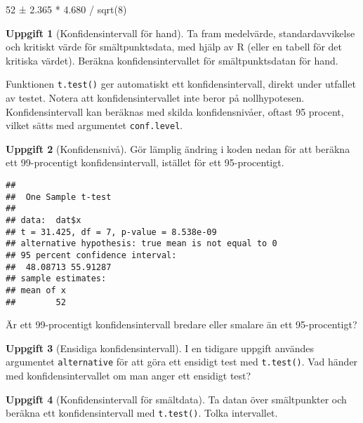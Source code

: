 \documentclass[
]{book}
\newenvironment{Shaded}{\begin{snugshade}}{\end{snugshade}}
\newcommand{\AttributeTok}[1]{\textcolor[rgb]{0.13,0.29,0.53}{#1}}
\newcommand{\FloatTok}[1]{\textcolor[rgb]{0.00,0.00,0.81}{#1}}
\newcommand{\FunctionTok}[1]{\textcolor[rgb]{0.13,0.29,0.53}{\textbf{#1}}}
\newcommand{\NormalTok}[1]{#1}
\newcommand{\SpecialCharTok}[1]{\textcolor[rgb]{0.81,0.36,0.00}{\textbf{#1}}}
\theoremstyle{definition}
\theoremstyle{definition}
\theoremstyle{definition}
\newtheorem{exercise}{Uppgift}[chapter]
\theoremstyle{definition}
\theoremstyle{remark}
\begin{document}
52 ± 2.365 * 4.680 / sqrt(8)

\begin{exercise}[Konfidensintervall för hand]
Ta fram medelvärde, standardavvikelse och kritiskt värde för smältpunktsdata, med hjälp av R (eller en tabell för det kritiska värdet). Beräkna konfidensintervallet för smältpunktsdatan för hand.
\end{exercise}

Funktionen \texttt{t.test()} ger automatiskt ett konfidensintervall, direkt under utfallet av testet. Notera att konfidensintervallet inte beror på nollhypotesen. Konfidensintervall kan beräknas med skilda konfidensnivåer, oftast 95 procent, vilket sätts med argumentet \texttt{conf.level}.

\begin{exercise}[Konfidensnivå]
Gör lämplig ändring i koden nedan för att beräkna ett 99-procentigt konfidensintervall, istället för ett 95-procentigt.

\begin{Shaded}
\end{Shaded}

\begin{verbatim}
## 
##  One Sample t-test
## 
## data:  dat$x
## t = 31.425, df = 7, p-value = 8.538e-09
## alternative hypothesis: true mean is not equal to 0
## 95 percent confidence interval:
##  48.08713 55.91287
## sample estimates:
## mean of x 
##        52
\end{verbatim}

Är ett 99-procentigt konfidensintervall bredare eller smalare än ett 95-procentigt?
\end{exercise}

\begin{exercise}[Ensidiga konfidensintervall]
I en tidigare uppgift användes argumentet \texttt{alternative} för att göra ett ensidigt test med \texttt{t.test()}. Vad händer med konfidensintervallet om man anger ett ensidigt test?
\end{exercise}

\begin{exercise}[Konfidensintervall för smältdata]
Ta datan över smältpunkter och beräkna ett konfidensintervall med \texttt{t.test()}. Tolka intervallet.
\end{exercise}
\end{document}
